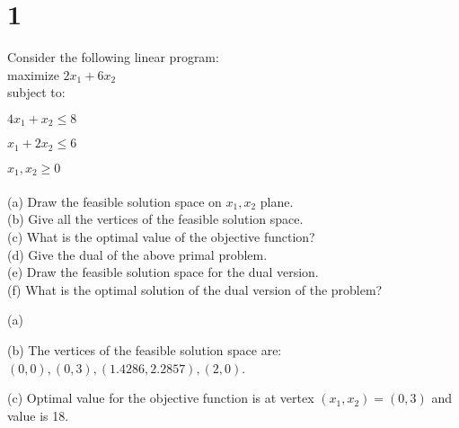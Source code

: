 \section*{1}
Consider the following linear program:\\
maximize $2x_1+ 6x_2$\\
subject to:

$4x_1+x_2 \leq 8$

$x_1+ 2x_2 \leq 6$

$x_1,x_2 \geq 0$\\\\
(a) Draw the feasible solution space on $x_1,x_2$ plane.\\
(b) Give all the vertices of the feasible solution space.\\
(c) What is the optimal value of the objective function?\\
(d) Give the dual of the above primal problem.\\
(e) Draw the feasible solution space for the dual version.\\
(f) What is the optimal solution of the dual version of the problem?
\probLine

\noindent(a)


\noindent(b) The vertices of the feasible solution space are: $(0,0), (0,3), (1.4286,2.2857), (2,0)$.

\noindent(c) Optimal value for the objective function is at vertex $(x_1,x_2) = (0,3)$ and value is 18.

